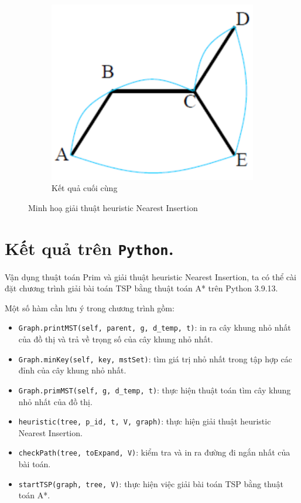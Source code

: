 \documentclass[a4paper, 11pt]{article}
\begin{document}
\begin{figure}[h]
  \hfill
  \begin{subfigure}{.3\linewidth}
    \centering
    \includegraphics[width=\textwidth,height=\textheight,keepaspectratio]{ni_6.png}
    \caption{Kết quả cuối cùng}
  \end{subfigure}
  \caption{Minh hoạ giải thuật heuristic Nearest Insertion}
\end{figure}

\clearpage
\section{Kết quả trên \lstinline|Python|.}
Vận dụng thuật toán Prim và giải thuật heuristic Nearest Insertion, ta có thể cài đặt chương trình giải bài toán TSP bằng thuật toán A* trên Python 3.9.13. 

Một số hàm cần lưu ý trong chương trình gồm:

\begin{itemize}
  \item \lstinline|Graph.printMST(self, parent, g, d_temp, t)|: in ra cây khung nhỏ nhất của đồ thị và trả về trọng số của cây khung nhỏ nhất.
  \item \lstinline|Graph.minKey(self, key, mstSet)|: tìm giá trị nhỏ nhất trong tập hợp các đỉnh của cây khung nhỏ nhất.
  \item \lstinline|Graph.primMST(self, g, d_temp, t)|: thực hiện thuật toán tìm cây khung nhỏ nhất của đồ thị.
  \item \lstinline|heuristic(tree, p_id, t, V, graph)|: thực hiện giải thuật heuristic Nearest Insertion.
  \item \lstinline|checkPath(tree, toExpand, V)|: kiểm tra và in ra đường đi ngắn nhất của bài toán.
  \item \lstinline|startTSP(graph, tree, V)|: thực hiện việc giải bài toán TSP bằng thuật toán A*.
\end{itemize}
\end{document}
